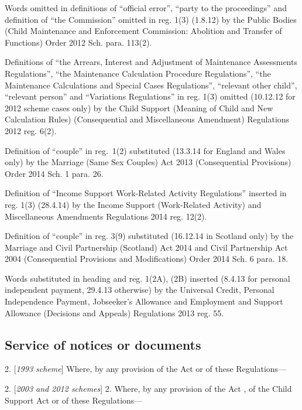 \documentclass[12pt,a4paper]{article}
\begin{document}
{Words omitted in definitions of ``official error'', ``party to the proceedings'' and definition of ``the Commission'' omitted in reg. 1(3) (1.8.12) by the Public Bodies (Child Maintenance and Enforcement Commission: Abolition and Transfer of Functions) Order 2012 Sch. para. 113(2).

Definitions of ``the Arrears, Interest and Adjustment of Maintenance Assessments Regulations'', ``the Maintenance Calculation Procedure Regulations'', ``the Maintenance Calculations and Special Cases Regulations'', ``relevant other child'', ``relevant person'' and ``Variations Regulations'' in reg. 1(3) omitted (10.12.12 for 2012 scheme cases only) by the Child Support (Meaning of Child and New Calculation Rules) (Consequential and Miscellaneous Amendment) Regulations 2012 reg. 6(2).

Definition of ``couple'' in reg.~1(2) substituted (13.3.14 for England and Wales only) by the Marriage (Same Sex Couples) Act 2013 (Consequential Provisions) Order 2014 Sch. 1 para. 26.

Definition of ``Income Support Work-Related Activity Regulations'' inserted in reg. 1(3) (28.4.14) by the Income Support (Work-Related Activity) and Miscellaneous Amendments Regulations 2014 reg. 12(2).

Definition of ``couple'' in reg. 3(9) substituted (16.12.14 in Scotland only) by the Marriage and Civil Partnership (Scotland) Act 2014 and Civil Partnership Act 2004 (Consequential Provisions and Modifications) Order 2014 Sch. 6 para. 18.

Words substituted in heading and reg. 1(2A), (2B) inserted (8.4.13 for personal independent payment, 29.4.13 otherwise) by the Universal Credit, Personal Independence Payment, Jobseeker's Allowance and Employment and Support Allowance (Decisions and Appeals) Regulations 2013 reg. 55.
}

\subsection[2. Service of notices or documents]{Service of notices or documents}

2.  [\emph{1993 scheme}] Where, by any provision of the Act or of these Regulations—

2.  [\emph{2003 and 2012 schemes}] 2.  Where, by any provision of the Act%
, of the Child Support Act
or of these Regulations—
\end{document}
